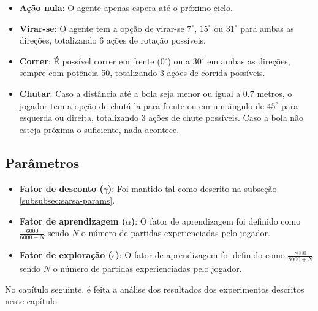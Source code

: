 \begin{itemize}
	\item \textbf{Ação nula}: O agente apenas espera até o próximo ciclo.
	
	\item \textbf{Virar-se}: O agente tem a opção de virar-se $7^{\circ}$, $15^{\circ}$ ou $31^{\circ}$ para ambas as direções, totalizando 6 ações de rotação possíveis. 
	
	\item \textbf{Correr}: É possível correr em frente ($0^{\circ}$) ou a $30^{\circ}$ em ambas as direções, sempre com potência 50, totalizando 3 ações de corrida possíveis.
	
	\item \textbf{Chutar}: Caso a distância até a bola seja menor ou igual a 0.7 metros, o jogador tem a opção de chutá-la para frente ou em um ângulo de $45^{\circ}$ para esquerda ou direita, totalizando 3 ações de chute possíveis. Caso a bola não esteja próxima o suficiente, nada acontece.
\end{itemize}

\subsection{Parâmetros}
\label{subsubsec:tabular-params}

\begin{itemize}
	\item \textbf{Fator de desconto ($\gamma$)}: Foi mantido tal como descrito na subseção \ref{subsubsec:sarsa-params}.
	
	\item \textbf{Fator de aprendizagem ($\alpha$)}: O fator de aprendizagem foi definido como $\frac{6000}{6000+N}$ sendo $N$ o número de partidas experienciadas pelo jogador. 
	
	\item \textbf{Fator de exploração ($\epsilon$)}: O fator de aprendizagem foi definido como $\frac{8000}{8000+N}$ sendo $N$ o número de partidas experienciadas pelo jogador. 
\end{itemize}

No capítulo seguinte, é feita a análise dos resultados dos experimentos descritos neste capítulo.
